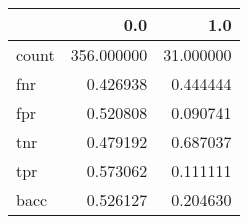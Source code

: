 \begin{tabular}{lrr}
\toprule
{} &         0.0 &        1.0 \\
\midrule
count &  356.000000 &  31.000000 \\
fnr   &    0.426938 &   0.444444 \\
fpr   &    0.520808 &   0.090741 \\
tnr   &    0.479192 &   0.687037 \\
tpr   &    0.573062 &   0.111111 \\
bacc  &    0.526127 &   0.204630 \\
\bottomrule
\end{tabular}
